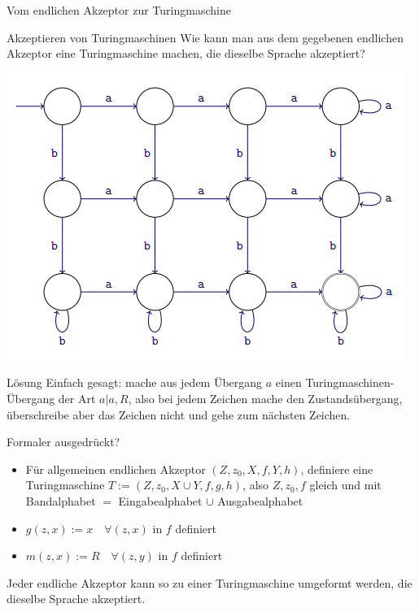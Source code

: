 \documentclass{beamer}
\begin{document}
\begin{frame}{Vom endlichen Akzeptor zur Turingmaschine}
	\begin{taskblock}{Akzeptieren von Turingmaschinen}
		Wie kann man aus dem gegebenen endlichen Akzeptor eine Turingmaschine machen, die dieselbe Sprache akzeptiert?
	\end{taskblock}

	\includegraphics[scale=0.5]{images/AufgAkzeptor2.png}
\end{frame}

\begin{frame}{Lösung}
	Einfach gesagt: mache aus jedem Übergang $a$ einen Turingmaschinen-Übergang der Art $a|a,R$, also bei jedem Zeichen mache den Zustandsübergang, überschreibe aber das Zeichen nicht und gehe zum nächsten Zeichen.
	
	\vspace{.2cm}
	\bp
	
	Formaler ausgedrückt? \pause 
	\begin{itemize}
		\item Für allgemeinen endlichen Akzeptor $(Z, z_0, X, f, Y, h)$, definiere eine Turingmaschine $T := (Z, z_0, X \cup Y, f, g, h)$, also $Z, z_0, f$ gleich und mit Bandalphabet $=$ Eingabealphabet $\cup$ Ausgabealphabet
		\item $g(z, x) := x \quad \forall (z,x)$ in $f$ definiert
		\item $m(z, x) := R \quad \forall (z,y)$ in $f$ definiert		
	\end{itemize}

	\bp
	
	Jeder endliche Akzeptor kann so zu einer Turingmaschine umgeformt werden, die dieselbe Sprache akzeptiert.
\end{frame}
\end{document}
